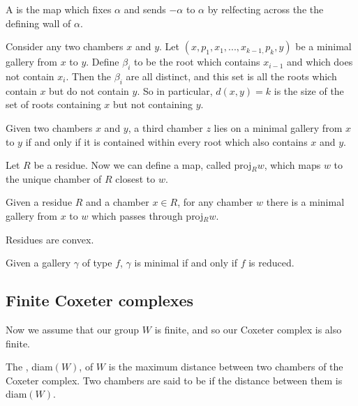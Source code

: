 \documentclass[11pt]{article}
\begin{document}
\begin{definition}
    A  is the map which fixes $\alpha$ and sends $-\alpha$ to $\alpha$ by relfecting across the the defining wall of $\alpha$. 
\end{definition}

\begin{proposition}
    Consider any two chambers $x$ and $y$. Let $(x,p_1,x_1,...,x_{k-1,}p_k,y)$ be a minimal gallery from $x$ to $y$. Define $\beta_i$ to be the root which contains $x_{i-1}$ and which does not contain $x_i$. Then the $\beta_i$ are all distinct, and this set is all the roots which contain $x$ but do not contain $y$. So in particular, $d(x,y)=k$ is the size of the set of roots containing $x$ but not containing $y$. 
\end{proposition}

\begin{proposition}
    Given two chambers $x$ and $y$, a third chamber $z$ lies on a minimal gallery from $x$ to $y$ if and only if it is contained within every root which also contains $x$ and $y$. 
\end{proposition}


Let $R$ be a residue. Now we can define a map, called proj$_Rw$, which maps $w$ to the unique chamber of $R$ closest to $w$. 


\begin{proposition}
    Given a residue $R$ and a chamber $x\in R$, for any chamber $w$ there is a minimal gallery from $x$ to $w$ which passes through proj$_Rw$. 
\end{proposition}

\begin{lemma}
    Residues are convex.
\end{lemma}

\begin{theorem}
    Given a gallery $\gamma$ of type $f$, $\gamma$ is minimal if and only if $f$ is reduced.
\end{theorem}


\subsection{Finite Coxeter complexes}

Now we assume that our group $W$ is finite, and so our Coxeter complex is also finite.

\begin{definition}
    The , diam$(W)$, of $W$ is the maximum distance between two chambers of the Coxeter complex. Two chambers are said to be  if the distance between them is diam$(W)$.
\end{definition}
\end{document}
